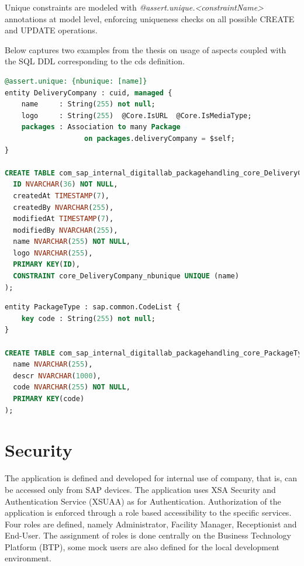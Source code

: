 Unique constraints are modeled with \textit{@assert.unique.<constraintName>} annotations at model level, enforcing uniqueness checks on all possible CREATE and UPDATE operations.

Below captures two examples from the thesis on usage of aspects coupled with the SQL DDL corresponding to the cds definition.
\begin{lstlisting}[language={sql}]
@assert.unique: {nbunique: [name]}
entity DeliveryCompany : cuid, managed {
    name     : String(255) not null;
    logo     : String(255)  @Core.IsURL  @Core.IsMediaType;
    packages : Association to many Package
                   on packages.deliveryCompany = $self;
}

CREATE TABLE com_sap_internal_digitallab_packagehandling_core_DeliveryCompany (
  ID NVARCHAR(36) NOT NULL,
  createdAt TIMESTAMP(7),
  createdBy NVARCHAR(255),
  modifiedAt TIMESTAMP(7),
  modifiedBy NVARCHAR(255),
  name NVARCHAR(255) NOT NULL,
  logo NVARCHAR(255),
  PRIMARY KEY(ID),
  CONSTRAINT core_DeliveryCompany_nbunique UNIQUE (name)
); 
\end{lstlisting}

\begin{lstlisting}[language={sql}]
entity PackageType : sap.common.CodeList {
    key code : String(255) not null;
}

CREATE TABLE com_sap_internal_digitallab_packagehandling_core_PackageType (
  name NVARCHAR(255),
  descr NVARCHAR(1000),
  code NVARCHAR(255) NOT NULL,
  PRIMARY KEY(code)
);
\end{lstlisting}
\section{Security}
The application is defined and developed for internal use of company, that is, can be accessed only from SAP devices. The application uses XSA Security and Authentication Service (XSUAA) as for Authentication. Authorization of the application is enforced through a role based accessibility to the specific services. Four roles are defined, namely Administrator, Facility Manager, Receptionist and End-User. The assignment of roles is done centrally on the Business Technology Platform (BTP), some mock users are also defined for the local development environment.


